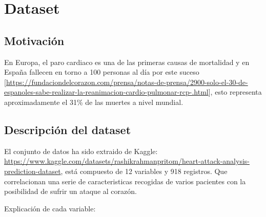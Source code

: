\documentclass[
]{article}
\begin{document}
\hypertarget{dataset}{%
\section{Dataset}\label{dataset}}

\hypertarget{motivaciuxf3n}{%
\subsection{Motivación}\label{motivaciuxf3n}}

En Europa, el paro cardiaco es una de las primeras causas de mortalidad
y en España fallecen en torno a 100 personas al día por este suceso
{[}\url{https://fundaciondelcorazon.com/prensa/notas-de-prensa/2900-solo-el-30-de-espanoles-sabe-realizar-la-reanimacion-cardio-pulmonar-rcp-.html}{]},
esto representa aproximadamente el 31\% de las muertes a nivel mundial.

\hypertarget{descripciuxf3n-del-dataset}{%
\subsection{Descripción del dataset}\label{descripciuxf3n-del-dataset}}

El conjunto de datos ha sido extraido de Kaggle:
\url{https://www.kaggle.com/datasets/rashikrahmanpritom/heart-attack-analysis-prediction-dataset},
está compuesto de 12 variables y 918 registros. Que correlacionan una
serie de caracteristicas recogidas de varios pacientes con la
posibilidad de sufrir un ataque al corazón.

Explicación de cada variable:
\end{document}
